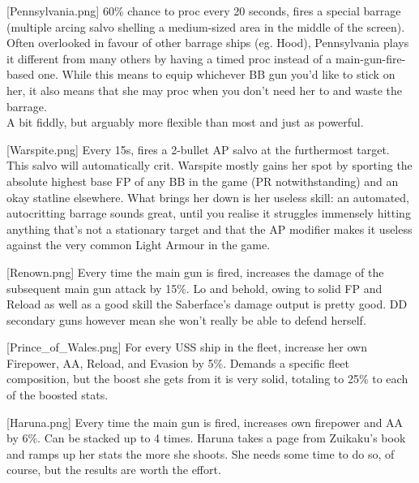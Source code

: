 [Pennsylvania.png]
{60\% chance to proc every 20 seconds, fires a special barrage (multiple arcing salvo shelling a medium-sized area in the middle of the screen).}
{}
{Often overlooked in favour of other barrage ships (eg. Hood), Pennsylvania plays it different from many others by having a timed proc instead of a main-gun-fire-based one. While this means to equip whichever BB gun you'd like to stick on her, it also means that she may proc when you don't need her to and waste the barrage.\\
A bit fiddly, but arguably more flexible than most and just as powerful.}

[Warspite.png]
{Every 15s, fires a 2-bullet AP salvo at the furthermost target. This salvo will automatically crit.}
{}
{Warspite mostly gains her spot by sporting the absolute highest base FP of any BB in the game (PR notwithstanding) and an okay statline elsewhere. What brings her down is her useless skill: an automated, autocritting barrage sounds great, until you realise it struggles immensely hitting anything that's not a stationary target and that the AP modifier makes it useless against the very common Light Armour in the game.}
 
[Renown.png]
{Every time the main gun is fired, increases the damage of the subsequent main gun attack by 15\%. }
{}
{Lo and behold, owing to solid FP and Reload as well as a good skill the Saberface's damage output is pretty good. DD secondary guns however mean she won't really be able to defend herself.}
 
[Prince_of_Wales.png]
{For every USS ship in the fleet, increase her own Firepower, AA, Reload, and Evasion by 5\%.}
{}
{Demands a specific fleet composition, but the boost she gets from it is very solid, totaling to 25\% to each of the boosted stats.}
 
[Haruna.png]
{Every time the main gun is fired, increases own firepower and AA by 6\%. Can be stacked up to 4 times.}
{}
{Haruna takes a page from Zuikaku's book and ramps up her stats the more she shoots. She needs some time to do so, of course, but the results are worth the effort.}

